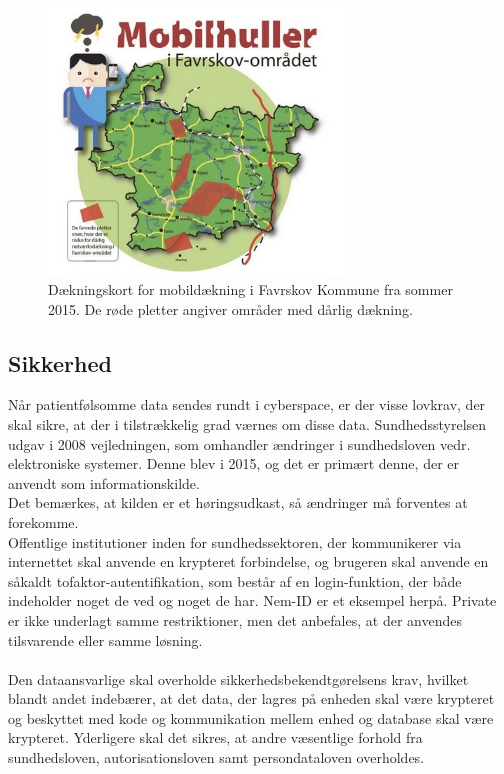 \begin{figure}[H]
\centering
\includegraphics[width=0.7\textwidth]{Figurer/daekningskort.png}
\caption{\label{fig:dkort}Dækningskort for mobildækning i Favrskov Kommune fra sommer 2015. De røde pletter angiver områder med dårlig dækning\cite{daekningskort}.}
\end{figure}

\subsection{Sikkerhed}
Når patientfølsomme data sendes rundt i cyberspace, er der visse lovkrav, der skal sikre, at der i tilstrækkelig grad værnes om disse data.
Sundhedsstyrelsen udgav i 2008 vejledningen, som omhandler ændringer i sundhedsloven vedr. elektroniske systemer. Denne blev i 2015, og det er primært denne, der er anvendt som informationskilde\cite{vogi}.\\Det bemærkes, at kilden er et høringsudkast, så ændringer må forventes at forekomme.\\
Offentlige institutioner inden for sundhedssektoren, der kommunikerer via internettet skal anvende en krypteret forbindelse, og brugeren skal anvende en såkaldt tofaktor-autentifikation, som består af en login-funktion, der både indeholder noget de ved og noget de har. Nem-ID er et eksempel herpå. Private er ikke underlagt samme restriktioner, men det anbefales, at der anvendes tilsvarende eller samme løsning.\\ \\
Den dataansvarlige skal overholde sikkerhedsbekendtgørelsens krav, hvilket blandt andet indebærer, at det data, der lagres på enheden skal være krypteret og beskyttet med kode og kommunikation mellem enhed og database skal være krypteret\cite{shbekendt}. Yderligere skal det sikres, at andre væsentlige forhold fra sundhedsloven, autorisationsloven samt persondataloven overholdes. 

